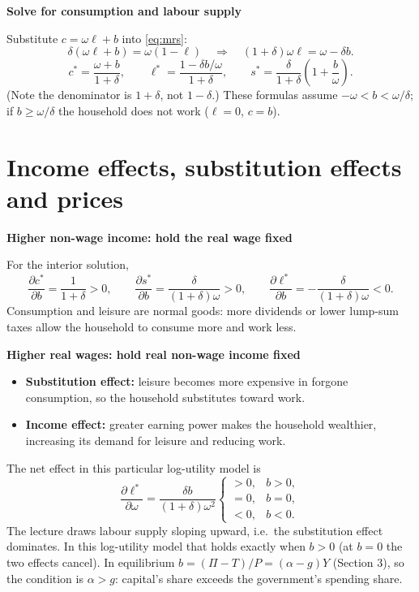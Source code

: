 \documentclass[11pt,letterpaper]{article}
\newcommand{\topic}[1]{\par\Needspace{4\baselineskip}\medskip\textbf{#1}\par\nobreak}
\newcommand{\w}{\omega}
\begin{document}
\topic{Solve for consumption and labour supply}
Substitute $c=\w\ell+b$ into \eqref{eq:mrs}:
\[
  \delta(\w\ell+b)=\w(1-\ell)
  \quad\Longrightarrow\quad (1+\delta)\w\ell=\w-\delta b.
\]
\begin{equation}
 \boxed{\quad
 c^*=\frac{\w+b}{1+\delta},\qquad
 \ell^*=\frac{1-\delta b/\w}{1+\delta},\qquad
 s^*=\frac{\delta}{1+\delta}\left(1+\frac{b}{\w}\right).
 \quad}
 \label{eq:choices}
\end{equation}
(Note the denominator is $1+\delta$, not $1-\delta$.) These formulas assume
$-\w<b<\w/\delta$; if $b\geq\w/\delta$ the household does not work ($\ell=0$, $c=b$).

\newpage
\section{Income effects, substitution effects and prices}
\topic{Higher non-wage income: hold the real wage fixed}
For the interior solution,
\[
 \frac{\partial c^*}{\partial b}=\frac{1}{1+\delta}>0,\qquad
 \frac{\partial s^*}{\partial b}=\frac{\delta}{(1+\delta)\w}>0,\qquad
 \frac{\partial\ell^*}{\partial b}=-\frac{\delta}{(1+\delta)\w}<0.
\]
Consumption and leisure are normal goods: more dividends or lower lump-sum taxes
allow the household to consume more and work less.

\topic{Higher real wages: hold real non-wage income fixed}
\begin{itemize}
 \item \textbf{Substitution effect:} leisure becomes more expensive in forgone
 consumption, so the household substitutes toward work.
 \item \textbf{Income effect:} greater earning power makes the household wealthier,
 increasing its demand for leisure and reducing work.
\end{itemize}
The net effect in this particular log-utility model is
\begin{equation}
 \frac{\partial\ell^*}{\partial\w}
   =\frac{\delta b}{(1+\delta)\w^2}
   \begin{cases}>0,&b>0,\\=0,&b=0,\\<0,&b<0.\end{cases}
 \label{eq:supplysign}
\end{equation}
The lecture draws labour supply sloping upward, i.e.\ the substitution effect
dominates. In this log-utility model that holds exactly when $b>0$ (at $b=0$
the two effects cancel). In equilibrium $b=(\Pi-T)/P=(\alpha-g)Y$ (Section 3),
so the condition is $\alpha>g$: capital's share exceeds the government's spending share.
\end{document}
